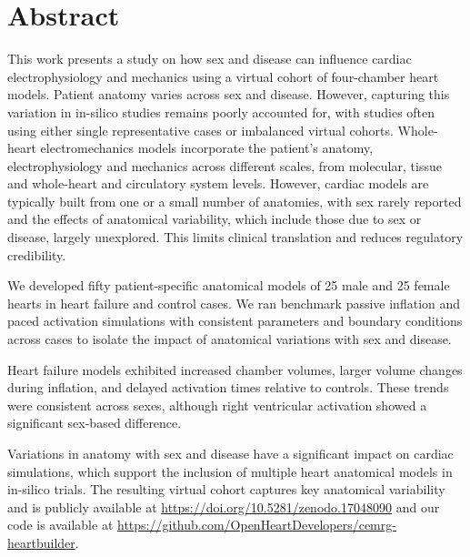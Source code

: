 \documentclass[10pt,letterpaper]{article}
\begin{document}

%
\section*{Abstract}
This work presents a study on how sex and disease can influence cardiac electrophysiology and 
    mechanics using a virtual cohort of four-chamber heart models.
    Patient anatomy varies across sex and disease. 
    However, capturing this variation in in-silico studies remains poorly accounted for,
    with studies often using either single representative cases or imbalanced virtual cohorts.
    Whole-heart electromechanics models incorporate the patient's anatomy, 
    electrophysiology and mechanics across different scales, from molecular, 
    tissue and whole-heart and circulatory system levels. 
    However, cardiac models are typically built from one or a small number of anatomies, 
    with sex rarely reported and the effects of anatomical variability, which include those due to 
    sex or disease, largely unexplored. 
    This limits clinical translation and reduces regulatory credibility.

    We developed fifty patient-specific anatomical models of 25 male and 25 female hearts in 
    heart failure and control cases.
    We ran benchmark passive inflation and paced activation simulations with consistent parameters and 
    boundary conditions across cases to isolate the impact of anatomical variations with sex and disease.

    Heart failure models exhibited increased chamber volumes, larger volume changes during inflation, 
    and delayed activation times relative to controls. 
    These trends were consistent across sexes, although right ventricular activation showed a significant 
    sex-based difference. 

    Variations in anatomy with sex and disease have a significant impact on cardiac simulations, 
    which support the inclusion of multiple heart anatomical models in in-silico trials.
    The resulting virtual cohort captures key anatomical variability and is publicly available at 
    \url{https://doi.org/10.5281/zenodo.17048090} and our code is available 
    at \url{https://github.com/OpenHeartDevelopers/cemrg-heartbuilder}.
\end{document}
